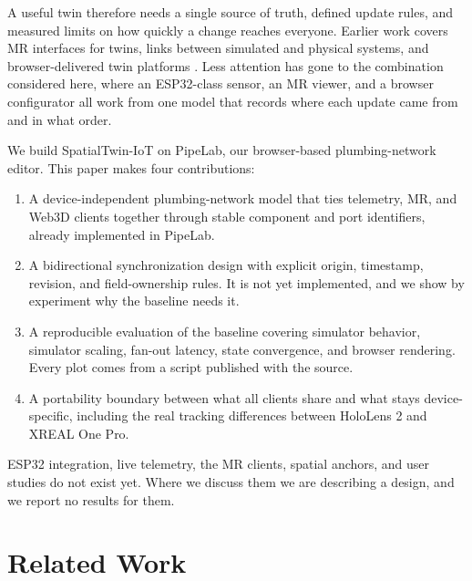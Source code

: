 \documentclass[conference]{IEEEtran}
\begin{document}
A useful twin therefore needs a single source of truth, defined update rules, and measured limits on how quickly a change reaches everyone. Earlier work covers MR interfaces for twins, links between simulated and physical systems, and browser-delivered twin platforms \cite{tu2021crane,tu2023twinxr,hao2024roadheader,kaarlela2023robotics,tran2025usd,hlayel2025latency,liang2020bridge,li2025platform,lei2022labs}. Less attention has gone to the combination considered here, where an ESP32-class sensor, an MR viewer, and a browser configurator all work from one model that records where each update came from and in what order.

We build SpatialTwin-IoT on PipeLab, our browser-based plumbing-network editor. This paper makes four contributions:
\begin{enumerate}
  \item A device-independent plumbing-network model that ties telemetry, MR, and Web3D clients together through stable component and port identifiers, already implemented in PipeLab.
  \item A bidirectional synchronization design with explicit origin, timestamp, revision, and field-ownership rules. It is not yet implemented, and we show by experiment why the baseline needs it.
  \item A reproducible evaluation of the baseline covering simulator behavior, simulator scaling, fan-out latency, state convergence, and browser rendering. Every plot comes from a script published with the source.
  \item A portability boundary between what all clients share and what stays device-specific, including the real tracking differences between HoloLens 2 and XREAL One Pro.
\end{enumerate}

ESP32 integration, live telemetry, the MR clients, spatial anchors, and user studies do not exist yet. Where we discuss them we are describing a design, and we report no results for them.

\section{Related Work}
\end{document}
